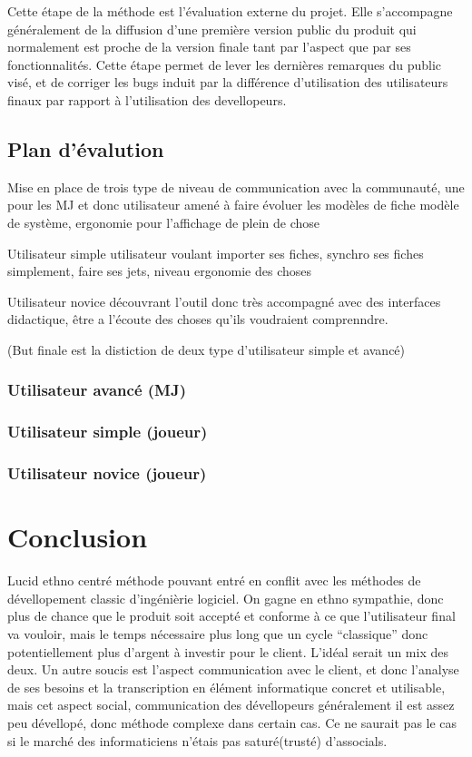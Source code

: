 \documentclass[11pt,a4paper]{article}
\begin{document}
Cette étape de la méthode est l'évaluation externe du projet. Elle s'accompagne
généralement de la diffusion d'une première version public du produit qui
normalement est proche de la version finale tant par l'aspect que par ses
fonctionnalités.
Cette étape permet de lever les dernières remarques du public visé, et de
corriger les bugs induit par la différence d'utilisation des utilisateurs finaux
par rapport à l'utilisation des devellopeurs.


\subsection{Plan d'évalution}

Mise en place de trois type de niveau de communication avec la communauté,
une pour les MJ et donc utilisateur amené à faire évoluer les modèles de fiche
modèle de système, ergonomie pour l'affichage de plein de chose

Utilisateur simple utilisateur voulant importer ses fiches, synchro ses fiches
simplement, faire ses jets, niveau ergonomie des choses

Utilisateur novice découvrant l'outil donc très accompagné avec des interfaces
didactique, être a l'écoute des choses qu'ils voudraient comprenndre.

(But finale est la distiction de deux type d'utilisateur simple et avancé)

\subsubsection{Utilisateur avancé (MJ)}

\subsubsection{Utilisateur simple (joueur)}

\subsubsection{Utilisateur novice (joueur)}
  

\section{Conclusion}
Lucid ethno centré
méthode pouvant entré en conflit avec les méthodes de dévellopement classic
d'ingénièrie logiciel.
On gagne en ethno sympathie, donc plus de chance que le produit soit accepté et
conforme à ce que l'utilisateur final va vouloir, mais le temps nécessaire plus
long que un cycle ``classique'' donc potentiellement plus d'argent à investir
pour le client. L'idéal serait un mix des deux.
Un autre soucis est l'aspect communication avec le client, et donc l'analyse de
ses besoins et la transcription en élément informatique concret et utilisable,
mais cet aspect social, communication des dévellopeurs généralement il est assez
peu dévellopé, donc méthode complexe dans certain cas. Ce ne saurait pas le cas
si le marché des informaticiens n'étais pas saturé(trusté) d'associals. 
  
  
\end{document}
